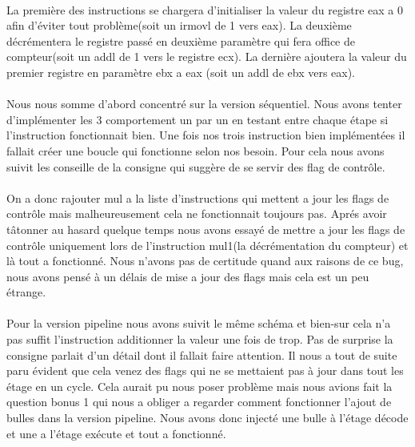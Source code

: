 \documentclass[12pt]{article}
\begin{document}
\paragraph{} La première des instructions se chargera d'initialiser la valeur du registre eax a 0 afin d'éviter tout problème(soit un irmovl de 1 vers eax). La deuxième décrémentera le registre passé en deuxième paramètre qui fera office de compteur(soit un addl de 1 vers le registre ecx). La dernière ajoutera la valeur du premier registre en paramètre ebx a eax (soit un addl de ebx vers eax).

\paragraph{} Nous nous somme d’abord concentré sur la version séquentiel. Nous avons tenter d’implémenter les 3 comportement un par un en testant entre chaque étape si l'instruction fonctionnait bien. Une fois nos trois instruction bien implémentées il fallait créer une boucle qui fonctionne selon nos besoin. Pour cela nous avons suivit les conseille de la consigne qui suggère de se servir des flag de contrôle.

\paragraph{} On a donc rajouter mul a la liste d'instructions qui mettent a jour les flags de contrôle mais malheureusement cela ne fonctionnait toujours pas. Aprés avoir tâtonner au hasard quelque temps nous avons essayé de mettre a jour les flags de contrôle uniquement lors de l'instruction mul1(la décrémentation du compteur) et là tout a fonctionné. Nous n'avons pas de certitude quand aux raisons de ce bug, nous avons pensé à un délais de mise a jour des flags mais cela est un peu étrange.

\paragraph{}Pour la version pipeline nous avons suivit le même schéma et bien-sur cela n'a pas suffit l'instruction additionner la valeur une fois de trop. Pas de surprise la consigne parlait d'un détail dont il fallait faire attention. Il nous a tout de suite paru évident que cela venez des flags qui ne se mettaient pas à jour dans tout les étage en un cycle. Cela aurait pu nous poser problème mais nous avions fait la question bonus 1 qui nous a obliger a regarder comment fonctionner l'ajout de bulles dans la version pipeline. Nous avons donc injecté une bulle à l'étage décode et une a l'étage exécute et tout a fonctionné.
\end{document}
